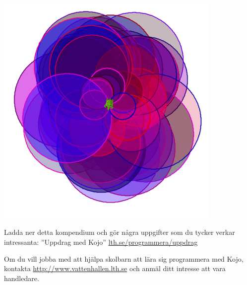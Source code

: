 \includegraphics[width=0.82\textwidth]{../img/kojo/random-color-circles.png}


\Task Ladda ner detta kompendium och gör några uppgifter som du tycker verkar intressanta:
''Uppdrag med Kojo'' \href{http://lth.se/programmera/uppdrag}{lth.se/programmera/uppdrag}


\Task Om du vill jobba med att hjälpa skolbarn att lära sig programmera med Kojo, kontakta \url{http://www.vattenhallen.lth.se} och anmäl ditt intresse att vara handledare.
